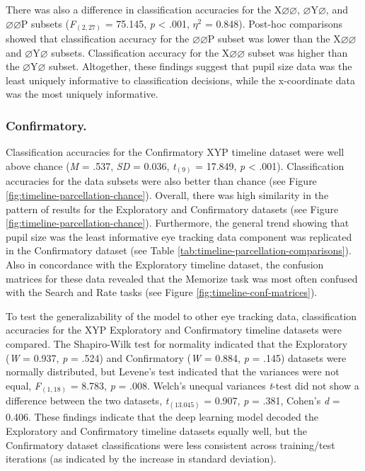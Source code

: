 \documentclass[
  english,
  man,floatsintext]{apa6}
\begin{document}
There was also a difference in classification accuracies for the X\(\varnothing\varnothing\), \(\varnothing\)Y\(\varnothing\), and \(\varnothing\varnothing\)P subsets (\emph{F}\(_{(2, 27)}\) = 75.145, \emph{p} \textless{} .001, \textit{$\eta$}\(^{2}\) = 0.848). Post-hoc comparisons showed that classification accuracy for the \(\varnothing\varnothing\)P subset was lower than the X\(\varnothing\varnothing\) and \(\varnothing\)Y\(\varnothing\) subsets. Classification accuracy for the X\(\varnothing\varnothing\) subset was higher than the \(\varnothing\)Y\(\varnothing\) subset. Altogether, these findings suggest that pupil size data was the least uniquely informative to classification decisions, while the x-coordinate data was the most uniquely informative.

\subsubsection{Confirmatory.}

Classification accuracies for the Confirmatory XYP timeline dataset were well above chance (\emph{M} = .537, \emph{SD} = 0.036, \emph{t}\(_{(9)}\) = 17.849, \emph{p} \textless{} .001). Classification accuracies for the data subsets were also better than chance (see Figure \ref{fig:timeline-parcellation-chance}). Overall, there was high similarity in the pattern of results for the Exploratory and Confirmatory datasets (see Figure \ref{fig:timeline-parcellation-chance}). Furthermore, the general trend showing that pupil size was the least informative eye tracking data component was replicated in the Confirmatory dataset (see Table \ref{tab:timeline-parcellation-comparisons}). Also in concordance with the Exploratory timeline dataset, the confusion matrices for these data revealed that the Memorize task was most often confused with the Search and Rate tasks (see Figure \ref{fig:timeline-conf-matrices}).

To test the generalizability of the model to other eye tracking data, classification accuracies for the XYP Exploratory and Confirmatory timeline datasets were compared. The Shapiro-Wilk test for normality indicated that the Exploratory (\emph{W} = 0.937, \emph{p} = .524) and Confirmatory (\emph{W} = 0.884, \emph{p} = .145) datasets were normally distributed, but Levene's test indicated that the variances were not equal, \emph{F}\(_{(1, 18)}\) = 8.783, \emph{p} = .008. Welch's unequal variances \emph{t}-test did not show a difference between the two datasets, \emph{t}\(_{(13.045)}\) = 0.907, \emph{p} = .381, Cohen's \emph{d} = 0.406. These findings indicate that the deep learning model decoded the Exploratory and Confirmatory timeline datasets equally well, but the Confirmatory dataset classifications were less consistent across training/test iterations (as indicated by the increase in standard deviation).
\end{document}
